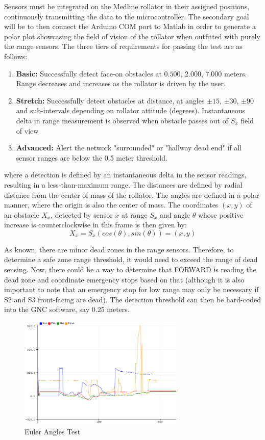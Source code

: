 \noindent Sensors must be integrated on the Medline rollator in their assigned positions, continuously transmitting the data to the microcontroller. The secondary goal will be to then connect the Arduino COM port to Matlab in order to generate a polar plot showcasing the field of vision of the rollator when outfitted with purely the range sensors. The three tiers of requirements for passing the test are as follows:
\begin{enumerate}
	\item \textbf{Basic:} Successfully detect face-on obstacles at $0.500$, $2.000$, $7.000$ meters. Range decreases and increases as the rollator is driven by the user.
	\item \textbf{Stretch:} Successfully detect obstacles at distance, at angles $\pm 15$, $\pm 30$, $\pm 90$ and sub-intervals depending on rollator attitude (degrees). Instantaneous delta in range measurement is observed when obstacle passes out of $S_x$ field of view
	\item \textbf{Advanced:} Alert the network "surrounded" or "hallway dead end" if all sensor ranges are below the 0.5 meter threshold.
\end{enumerate}
where a detection is defined by an instantaneous delta in the sensor readings, resulting in a less-than-maximum range. The distances are defined by radial distance from the center of mass of the rollator. The angles are defined in a polar manner, where the origin is also the center of mass. The coordinates $(x,y)$ of an obstacle $X_x$, detected by sensor $x$ at range $S_x$ and angle $\theta$ whose positive increase is counterclockwise in this frame is then given by:
$$X_x = S_x(cos(\theta), sin(\theta)) = (x,y)$$ \label{Polar}

\noindent As known, there are minor dead zones in the range sensors. Therefore, to determine a safe zone range threshold, it would need to exceed the range of dead sensing. Now, there could be a way to determine that FORWARD is reading the dead zone and coordinate emergency stops based on that (although it is also important to note that an emergency stop for low range may only be necessary if S2 and S3 front-facing are dead). The detection threshold can then be hard-coded into the GNC software, say $0.25$ meters.\\

\begin{figure}[H]
	\centering
	\includegraphics[width=0.7\textwidth]{./Images/serial-plotter.png}
	\caption{\label{fig:euler-test}Euler Angles Test}
\end{figure}

